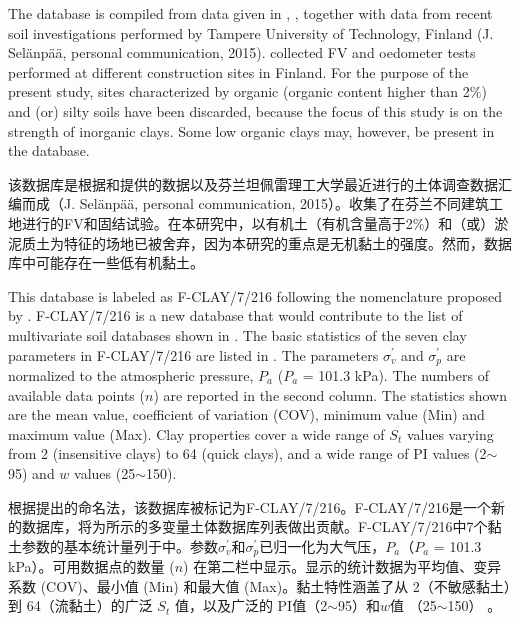\begin{ParaColumn}
    \switchcolumn*

    The database is compiled from data given in \citet{Gardemeister1973113}, \citet{Lehtonen2015961}, together with data from recent soil investigations performed by Tampere University of Technology, Finland (J. Selänpää, personal communication, 2015). \citet{Gardemeister1973113} collected FV and oedometer tests performed at different construction sites in Finland. For the purpose of the present study, sites characterized by organic (organic content higher than 2$\%$) and (or) silty soils have been discarded, because the focus of this study is on the strength of inorganic clays. Some low organic clays may, however, be present in the database.

    \switchcolumn

    该数据库是根据\citet{Gardemeister1973113}和\citet{Lehtonen2015961}提供的数据以及芬兰坦佩雷理工大学最近进行的土体调查数据汇编而成（J. Selänpää, personal communication, 2015）。\citet{Gardemeister1973113}收集了在芬兰不同建筑工地进行的FV和固结试验。在本研究中，以有机土（有机含量高于2$\%$）和（或）淤泥质土为特征的场地已被舍弃，因为本研究的重点是无机黏土的强度。然而，数据库中可能存在一些低有机黏土。

    \switchcolumn*

    This database is labeled as F-CLAY/7/216 following the nomenclature proposed by \citeyear{Ching2014663}. F-CLAY/7/216 is a new database that would contribute to the list of multivariate soil databases shown in . The basic statistics of the seven clay parameters in F-CLAY/7/216 are listed in . The parameters ${\sigma}_{v}^{\prime}$ and $\sigma_{p}^{\prime}$ are normalized to the atmospheric pressure, $P_a$ ($P_a$ = 101.3 kPa). The numbers of available data points ($n$) are reported in the second column. The statistics shown are the mean value, coefficient of variation (COV), minimum value (Min) and maximum value (Max). Clay properties cover a wide range of $S_t$ values varying from 2 (insensitive clays) to 64 (quick clays), and a wide range of PI values (2$\sim$95) and $w$ values (25$\sim$150).

    \switchcolumn

    根据\citeyear{Ching2014663}提出的命名法，该数据库被标记为F-CLAY/7/216。F-CLAY/7/216是一个新的数据库，将为所示的多变量土体数据库列表做出贡献。F-CLAY/7/216中7个黏土参数的基本统计量列于中。参数${\sigma}_{v}^{\prime}$和$\sigma_{p}^{\prime}$已归一化为大气压，$P_a$（$P_a$ = 101.3 kPa）。可用数据点的数量 ($n$) 在第二栏中显示。显示的统计数据为平均值、变异系数 (COV)、最小值 (Min) 和最大值 (Max)。黏土特性涵盖了从 2（不敏感黏土）到 64（流黏土）的广泛 $S_t$ 值，以及广泛的 PI值（2$\sim$95）和$w$值 （25$\sim$150） 。


\end{ParaColumn}

